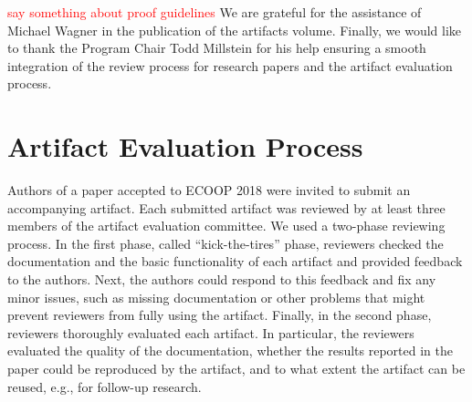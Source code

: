 \documentclass[a4paper,UKenglish]{dartsmaster}
\begin{document}
\textcolor{red}{say something about proof guidelines}
We are grateful for the assistance of Michael Wagner in the publication of
the artifacts volume. Finally, we would like to thank the Program Chair
Todd Millstein for his help ensuring a smooth integration of the review
process for research papers and the artifact evaluation process. 

\chapter{Artifact Evaluation Process}
Authors of a paper accepted to ECOOP 2018 were invited to submit an 
accompanying artifact. Each submitted artifact was reviewed by at least 
three members of the artifact evaluation committee. We used a two-phase 
reviewing process. In the first phase, called ``kick-the-tires'' phase, 
reviewers checked the documentation and the basic functionality of each 
artifact and provided feedback to the authors. Next, the authors could 
respond to this feedback and fix any minor issues, such as missing 
documentation or other problems that might prevent reviewers from fully 
using the artifact. Finally, in the second phase, reviewers thoroughly 
evaluated each artifact. In particular, the reviewers evaluated the quality 
of the documentation, whether the results reported in the paper could be 
reproduced by the artifact, and to what extent the artifact can be reused, 
e.g., for follow-up research.
\end{document}
